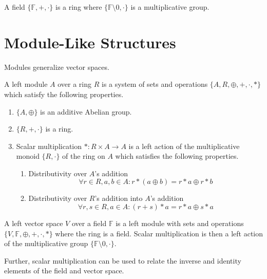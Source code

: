 \begin{definition}[Field]
	A field $\{ \mathbb{F}, +, \cdot \}$ is a ring where $\{ \mathbb{F} \setminus 0, \cdot \}$ is a multiplicative group.
\end{definition}

\section{Module-Like Structures}

Modules generalize vector spaces.

\begin{definition}
	A left module $A$ over a ring $R$ is a system of sets and operations $\{ A, R, \oplus, +, \cdot, * \}$ which satisfy the following properties.
	\begin{enumerate}
		\item $\{ A, \oplus \}$ is an additive Abelian group.
		\item $\{ R, +, \cdot \}$ is a ring.
		\item Scalar multiplication $*: R \times A \rightarrow A$ is a left action of the multiplicative monoid $\{ R, \cdot \}$ of the ring on $A$ which satisfies the following properties.
		\begin{enumerate}
			\item Distributivity over $A$'s addition
			\begin{equation}
				\forall r \in R, a, b \in A: r * (a \oplus b) = r * a \oplus r * b
			\end{equation}
			\item Distributivity over $R$'s addition into $A$'s addition
			\begin{equation}
				\forall r, s \in R, a \in A: (r + s) * a = r * a \oplus s * a
			\end{equation}
		\end{enumerate}
	\end{enumerate}
\end{definition}

\begin{definition}
	A left vector space $V$ over a field $\mathbb{F}$ is a left module with sets and operations $\{V, \mathbb{F}, \oplus, +, \cdot, *\}$ where the ring is a field. Scalar multiplication is then a left action of the multiplicative group $\{ \mathbb{F} \setminus 0, \cdot \}$.
\end{definition}

Further, scalar multiplication can be used to relate the inverse and identity elements of the field and vector space.

